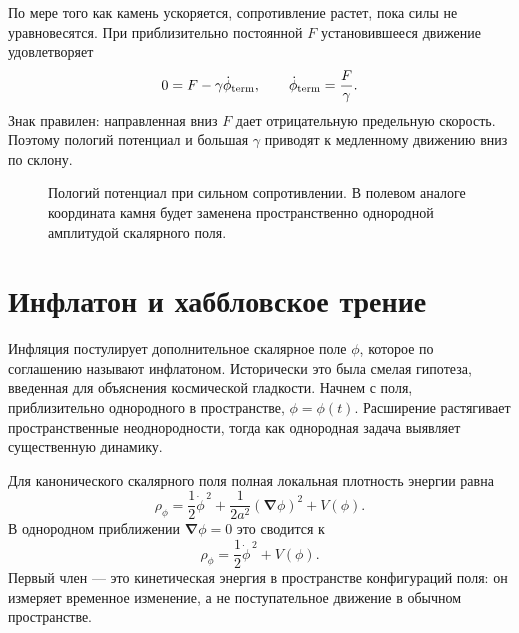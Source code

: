 По мере того как камень ускоряется, сопротивление растет, пока силы не уравновесятся. При приблизительно постоянной \(F\) установившееся движение удовлетворяет
\begin{equation}
0=F-\gamma\dot\phi_{\rm term},
\qquad
\dot\phi_{\rm term}=\frac{F}{\gamma}.
\end{equation}
Знак правилен: направленная вниз \(F\) дает отрицательную предельную скорость. Поэтому пологий потенциал и большая \(\gamma\) приводят к медленному движению вниз по склону.

\begin{figure}[htbp]
\centering
{}
\caption{Пологий потенциал при сильном сопротивлении. В полевом аналоге координата камня будет заменена пространственно однородной амплитудой скалярного поля.}
\label{fig:c08-shallow-potential}
\end{figure}

\section{Инфлатон и хаббловское трение}

Инфляция постулирует дополнительное скалярное поле \(\phi\), которое по соглашению называют инфлатоном. Исторически это была смелая гипотеза, введенная для объяснения космической гладкости. Начнем с поля, приблизительно однородного в пространстве, \(\phi=\phi(t)\). Расширение растягивает пространственные неоднородности, тогда как однородная задача выявляет существенную динамику.

Для канонического скалярного поля полная локальная плотность энергии равна
\begin{equation}
\rho_\phi
=
\frac12\dot\phi^{\,2}
+\frac{1}{2a^2}(\boldsymbol\nabla\phi)^2
+V(\phi).
\end{equation}
В однородном приближении \(\boldsymbol\nabla\phi=0\) это сводится к
\begin{equation}
\rho_\phi=\frac12\dot\phi^{\,2}+V(\phi).
\label{eq:c08-scalar-density}
\end{equation}
Первый член — это кинетическая энергия в пространстве конфигураций поля: он измеряет временное изменение, а не поступательное движение в обычном пространстве.

